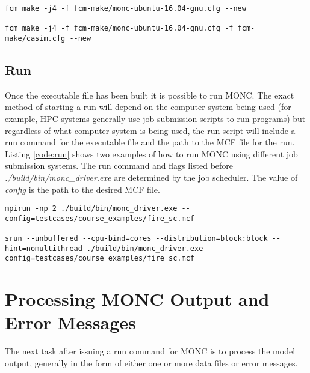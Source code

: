 \begin{lstlisting}[caption={Examples of FCM make commands for building MONC on an Ubuntu 16.04 LDT computer system. The first command builds MONC without any external components. The second command builds MONC coupled with CASIM.},label={code:make},belowskip=-1cm]
fcm make -j4 -f fcm-make/monc-ubuntu-16.04-gnu.cfg --new

fcm make -j4 -f fcm-make/monc-ubuntu-16.04-gnu.cfg -f fcm-make/casim.cfg --new 
\end{lstlisting}

\subsection{Run}
Once the executable file has been built it is possible to run MONC. The exact method of starting a run will depend on the computer system being used (for example, HPC systems generally use job submission scripts to run programs) but regardless of what computer system is being used, the run script will include a run command for the executable file and the path to the MCF file for the run. Listing \ref{code:run} shows two examples of how to run MONC using different job submission systems. The run command and flags listed before \textit{./build/bin/monc\_driver.exe} are determined by the job scheduler. The value of \textit{config} is the path to the desired MCF file. \citep{moncGuides}

\begin{lstlisting}[caption={Examples of MONC run commands for use on different computer systems. The run command and flags listed before \textit{./build/bin/monc\_driver.exe} are determined by the job scheduler. The value of \textit{config} is the path to the desired MCF file.},label={code:run},belowskip=-1cm]
mpirun -np 2 ./build/bin/monc_driver.exe --config=testcases/course_examples/fire_sc.mcf 

srun --unbuffered --cpu-bind=cores --distribution=block:block --hint=nomultithread ./build/bin/monc_driver.exe --config=testcases/course_examples/fire_sc.mcf
\end{lstlisting}

\section{Processing MONC Output and Error Messages} \label{ch:processing}
The next task after issuing a run command for MONC is to process the model output, generally in the form of either one or more data files or error messages. 

